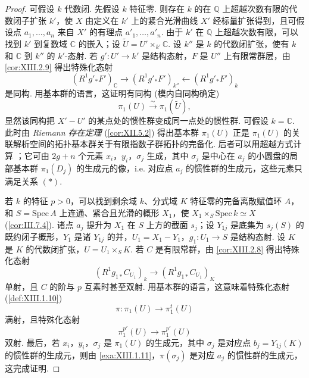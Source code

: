 \begin{proof}
可假设 $k$ 代数闭. 先假设 $k$ 特征零. 则存在 $k$ 的在 $\mathbb{Q}$ 上超越次数有限的代数闭子扩张 $k'$，使 $X$ 由定义在 $k'$ 上的紧合光滑曲线 $X'$ 经标量扩张得到，且可假设点 $a_1, \ldots, a_n$ 来自 $X'$ 的有理点 $a'_1, \ldots, a'_n$. 由于 $k'$ 在 $\mathbb{Q}$ 上超越次数有限，可以找到 $k'$ 到复数域 $\mathbb{C}$ 的嵌入；设 $\widetilde{U} = U' \times_{k'} \mathbb{C}$. 设 $k''$ 是 $k$ 的代数闭扩张，使有 $k$ 和 $\mathbb{C}$ 到 $k''$ 的 $k'$-态射. 若 $g' \colon U' \to k'$ 是结构态射，$F$ 是 $U''$ 上有限常群层，由 \ref{cor:XIII.2.9} 得出特殊化态射
\[
(R^1 g'_* F')_{\mathbb{C}} \longrightarrow (R^1 g'_* F')_{k''} \longleftarrow (R^1 g'_* F')_k
\]
是同构. 用基本群的语言，这证明有同构 (模内自同构确定)
\[
\pi_1(U) \xrightarrow{\sim} \pi_1(\widetilde{U}),
\]
显然该同构把 $X' - U'$ 的某点处的惯性群变成同一点处的惯性群. 可假设 $k = \mathbb{C}$. 此时由 \emph{Riemann 存在定理} (\cref{cor:XII.5.2}) 得出基本群 $\pi_1(U)$ 正是 $\pi_1(U)$ 的关联解析空间的拓扑基本群关于有限指数子群拓扑的完备化. 后者可以用超越方式计算 \cite[第 7 章 §47]{exp13-3}；它可由 $2g + n$ 个元素 $x_i$，$y_i$，$\sigma_j$ 生成，其中 $\sigma_j$ 是中心在 $a_j$ 的小圆盘的局部基本群 $\pi_1(D_j)$ 的生成元的像，i.e. 对应点 $a_j$ 的惯性群的生成元，这些元素只满足关系 $(\ast)$.

若 $k$ 的特征 $p > 0$，可以找到剩余域 $k$、分式域 $K$ 特征零的完备离散赋值环 $A$，和 $S = \mathrm{Spec}\, A$ 上连通、紧合且光滑的概形 $X_1$，使 $X_1 \times_S \mathrm{Spec}\, k \simeq X$ (\cref{cor:III.7.4}). 诸点 $a_j$ 提升为 $X_1$ 在 $S$ 上方的截面 $s_j$；设 $Y_{1j}$ 是底集为 $s_j(S)$ 的既约闭子概形，$Y_1$ 是诸 $Y_{1j}$ 的并，$U_1 = X_1 - Y_1$，$g_1 \colon U_1 \to S$ 是结构态射. 设 $K$ 是 $K$ 的代数闭扩张，$U = U_1 \times_S K$. 若 $C$ 是有限常群，由 \ref{cor:XIII.2.8} 得出特殊化态射
\[
(R^1 g_{1*} C_{U_1})_k \longrightarrow (R^1 g_{1*} C_{U_1})_K
\]
单射，且 $C$ 的阶与 $p$ 互素时甚至双射. 用基本群的语言，这意味着特殊化态射 (\cref{def:XIII.1.10})
\[
\pi \colon \pi_1(U) \longrightarrow \pi^t_1(U)
\]
满射，且特殊化态射
\[
\pi^{p'}_1(U) \longrightarrow \pi^{p'}_1(U)
\]
双射. 最后，若 $x_i$，$y_i$，$\sigma_j$ 是 $\pi_1(U)$ 的生成元，其中 $\sigma_j$ 是对应点 $b_j = Y_{1j}(K)$ 的惯性群的生成元，则由 \ref{exa:XIII.1.11}，$\pi(\sigma_j)$ 是对应 $a_j$ 的惯性群的生成元，这完成证明.
\end{proof}

